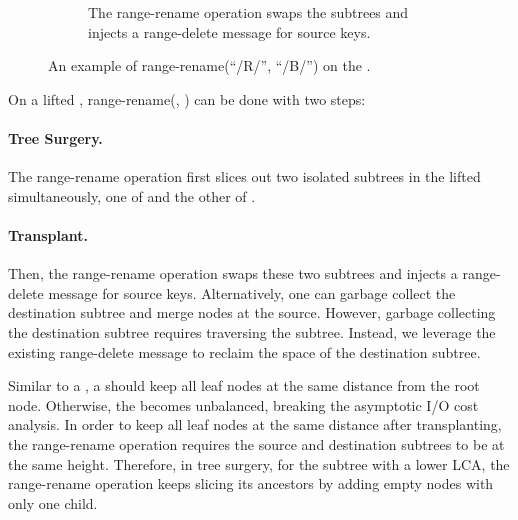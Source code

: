 \begin{figure}
\begin{subfigure}{\textwidth}
        \caption{\label{subfig:rr-3} The range-rename operation swaps the subtrees and
            injects a range-delete message for source keys.}
    \end{subfigure}
    \caption[A range-rename example]{\label{fig:rr}
        An example of range-rename(``/R/'', ``/B/'') on the \bet.}
\end{figure}

On a lifted \bet, range-rename(\spre, \dpre) can be done with two steps:

\paragraph{Tree Surgery.}
The range-rename operation first slices out two isolated subtrees in the lifted
\bet simultaneously, one of \spre and the other of \dpre.

\paragraph{Transplant.}
Then, the range-rename operation swaps these two subtrees and injects a
range-delete message for source keys.
Alternatively, one can garbage collect the destination subtree and merge nodes
at the source.
However, garbage collecting the destination subtree requires traversing
the subtree.
Instead, we leverage the existing range-delete message to reclaim the space
of the destination subtree.

Similar to a \btree, a \bet should keep all leaf nodes at the same distance
from the root node.
Otherwise, the \bet becomes unbalanced, breaking the asymptotic I/O cost
analysis.
In order to keep all leaf nodes at the same distance after transplanting,
the range-rename operation requires the source and destination subtrees to be at
the same height.
Therefore, in tree surgery, for the subtree with a lower LCA,
the range-rename operation keeps slicing its ancestors by adding empty nodes
with only one child.


